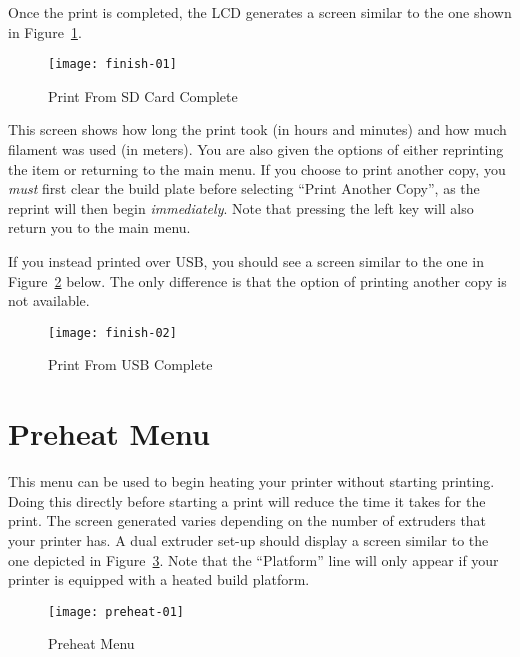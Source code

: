 Once the print is completed, the LCD generates a screen similar to the one shown in Figure~\ref{fig:printcomplete}.

\begin{figure}[!htbp]
  \centering
    \texttt{[image: finish-01]}
    \caption{Print From SD Card Complete}
  \label{fig:printcomplete}
\end{figure}

This screen shows how long the print took (in hours and minutes) and how much filament was used (in meters).  You are also given the options of either reprinting the item or returning to the main menu.  If you choose to print another copy, you \emph{must} first clear the build plate before selecting ``Print Another Copy'', as the reprint will then begin \emph{immediately}.  Note that pressing the left key will also return you to the main menu.

If you instead printed over USB, you should see a screen similar to the one in Figure~\ref{fig:usbprint} below.  The only difference is that the option of printing another copy is not available.

\begin{figure}[!htbp]
  \centering
    \texttt{[image: finish-02]}
    \caption{Print From USB Complete}
  \label{fig:usbprint}
\end{figure}


\section{Preheat Menu}\label{sec:preheat}

This menu can be used to begin heating your printer without starting printing.  Doing this directly before starting a print will reduce the time it takes for the print.  The screen generated varies depending on the number of extruders that your printer has.  A dual extruder set-up should display a screen similar to the one depicted in Figure~\ref{fig:preheat}.  Note that the ``Platform'' line will only appear if your printer is equipped with a heated build platform.

\begin{figure}[!htbp]
  \centering
    \texttt{[image: preheat-01]}
    \caption{Preheat Menu}
  \label{fig:preheat}
\end{figure}

